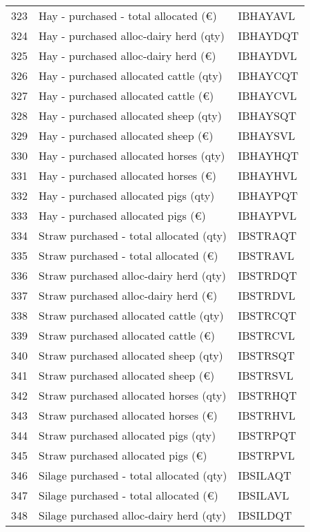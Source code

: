 \documentclass{article}\usepackage{graphicx, color}
\begin{document}
\begin{flushleft}
\begin{table}[ht]
\begin{center}
\begin{tabular}{rll}
  323 & Hay - purchased - total allocated  (€) & IBHAYAVL \\ 
  324 & Hay - purchased alloc-dairy herd (qty) & IBHAYDQT \\ 
  325 & Hay - purchased alloc-dairy herd (€) & IBHAYDVL \\ 
  326 & Hay - purchased allocated cattle (qty) & IBHAYCQT \\ 
  327 & Hay - purchased allocated cattle (€) & IBHAYCVL \\ 
  328 & Hay - purchased allocated sheep  (qty) & IBHAYSQT \\ 
  329 & Hay - purchased allocated sheep  (€) & IBHAYSVL \\ 
  330 & Hay - purchased allocated horses (qty) & IBHAYHQT \\ 
  331 & Hay - purchased allocated horses (€) & IBHAYHVL \\ 
  332 & Hay - purchased allocated pigs   (qty) & IBHAYPQT \\ 
  333 & Hay - purchased allocated pigs   (€) & IBHAYPVL \\ 
  334 & Straw purchased - total allocated  (qty) & IBSTRAQT \\ 
  335 & Straw purchased - total allocated  (€) & IBSTRAVL \\ 
  336 & Straw purchased alloc-dairy herd (qty) & IBSTRDQT \\ 
  337 & Straw purchased alloc-dairy herd (€) & IBSTRDVL \\ 
  338 & Straw purchased allocated cattle (qty) & IBSTRCQT \\ 
  339 & Straw purchased allocated cattle (€) & IBSTRCVL \\ 
  340 & Straw purchased allocated sheep  (qty) & IBSTRSQT \\ 
  341 & Straw purchased allocated sheep  (€) & IBSTRSVL \\ 
  342 & Straw purchased allocated horses (qty) & IBSTRHQT \\ 
  343 & Straw purchased allocated horses (€) & IBSTRHVL \\ 
  344 & Straw purchased allocated pigs   (qty) & IBSTRPQT \\ 
  345 & Straw purchased allocated pigs   (€) & IBSTRPVL \\ 
  346 & Silage purchased - total allocated (qty) & IBSILAQT \\ 
  347 & Silage purchased - total allocated  (€) & IBSILAVL \\ 
  348 & Silage purchased alloc-dairy herd (qty) & IBSILDQT \\ 

\end{tabular}
\end{center}
\end{table}
\end{flushleft}
\end{document}
